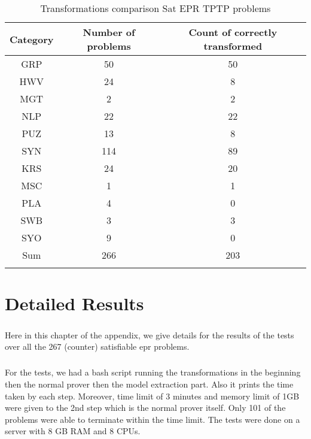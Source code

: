 \begin{minipage}{\textwidth}

\begin{center}
		\begin{longtable}{||c | c | c||} 
 		\toprule
		Category & Number of problems & Count of correctly transformed \\ %
		\midrule
		GRP & 50 & 50 \\
		HWV & 24 & 8 \\
		MGT & 2 & 2 \\
		NLP & 22 & 22 \\
		PUZ & 13 & 8 \\
		SYN & 114 & 89 \\
		KRS & 24 & 20 \\
		MSC & 1 & 1 \\
		PLA & 4 & 0 \\
		SWB & 3 & 3 \\
		SYO & 9 & 0 \\
		\midrule
		Sum & 266 & 203 \\ %
		\bottomrule
		\caption{Transformations comparison Sat EPR TPTP problems}
		\label{table:trans_valid_results}
		\end{longtable}
	\end{center}
\end{minipage}



\chapter{Detailed Results}\label{chap:appendix_res}

\paragraph{}
Here in this chapter of the appendix, we give details for the results of the tests over all the 267 (counter) satisfiable \ac{epr} problems.

\paragraph{}
For the tests, we had a bash script running the transformations in the beginning then the normal prover then the model extraction part. Also it prints the time taken by each step. Moreover, time limit of 3 minutes and memory limit of 1GB were given to the 2nd step which is the normal prover itself. Only 101 of the problems were able to terminate within the time limit. The tests were done on a server with 8 GB RAM and 8 CPUs.

